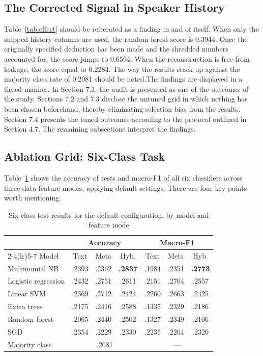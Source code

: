 \documentclass[10pt,twocolumn,twoside,a4paper]{article}
\newcommand{\best}[1]{\textbf{#1}}
\begin{document}
\subsection{The Corrected Signal in Speaker History}

Table~\ref{tab:effect} should be reiterated as a finding in and of itself. When only the shipped history columns are used, the random forest score is 0.3944. Once the originally specified deduction has been made and the shredded numbers accounted for, the score jumps to 0.6594. When the reconstruction is free from leakage, the score equal to 0.2284. The way the results stack up against the majority class rate of 0.2081 should be noted.The findings are displayed in a tiered manner. In Section 7.1, the audit is presented as one of the outcomes of the study. Sections 7.2 and 7.3 disclose the untuned grid in which nothing has been chosen beforehand, thereby eliminating selection bias from the results. Section 7.4 presents the tuned outcomes according to the protocol outlined in Section 4.7. The remaining subsections interpret the findings.

\subsection{Ablation Grid: Six-Class Task}

Table~\ref{tab:6class} shows the accuracy of tests and macro-F1 of all six classifiers across three data feature modes, applying default settings. There are four key points worth mentioning.

\begin{table}[t]
\caption{Six-class test results for the default configuration, by model and
feature mode}
\label{tab:6class}
\centering
\footnotesize
\begin{tabular}{@{}lcccccc@{}}
\toprule
& \multicolumn{3}{c}{Accuracy} & \multicolumn{3}{c}{Macro-F1} \\
\cmidrule(lr){2-4}\cmidrule(lr){5-7}
Model & Text & Meta & Hyb. & Text & Meta & Hyb. \\
\midrule
Multinomial NB      & .2393 & .2362 & \best{.2837} & .1984 & .2351 & \best{.2773} \\
Logistic regression & .2432 & .2751 & .2611 & .2151 & .2704 & .2557 \\
Linear SVM          & .2369 & .2712 & .2424 & .2260 & .2663 & .2425 \\
Extra trees         & .2175 & .2416 & .2588 & .1335 & .2329 & .2186 \\
Random forest       & .2065 & .2440 & .2502 & .1327 & .2349 & .2106 \\
SGD                 & .2354 & .2229 & .2330 & .2235 & .2204 & .2320 \\
\midrule
Majority class      & \multicolumn{3}{c}{.2081} & \multicolumn{3}{c}{---} \\
\bottomrule
\end{tabular}
\end{table}
\end{document}
